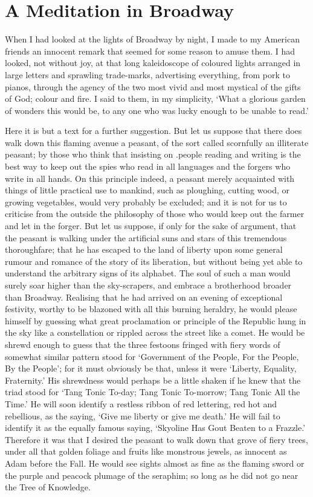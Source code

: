 \documentclass{book}
\begin{document}
\chapter{A Meditation in Broadway}
\label{chapter-2}
When I had looked at the lights of Broadway by night, I made to my American friends an innocent remark that seemed for some reason to amuse them. I had looked, not without joy, at that long kaleidoscope of coloured lights arranged in large letters and sprawling trade-marks, advertising everything, from pork to pianos, through the agency of the two most vivid and most mystical of the gifts of God; colour and fire. I said to them, in my simplicity, ‘What a glorious garden of wonders this would be, to any one who was lucky enough to be unable to read.’

Here it is but a text for a further suggestion. But let us suppose that there does walk down this flaming avenue a peasant, of the sort called scornfully an illiterate peasant; by those who think that insisting on .people reading and writing is the best way to keep out the spies who read in all languages and the forgers who write in all hands. On this principle indeed, a peasant merely acquainted with things of little practical use to mankind, such as ploughing, cutting wood, or growing vegetables, would very probably be excluded; and it is not for us to criticise from the outside the philosophy of those who would keep out the farmer and let in the forger. But let us suppose, if only for the sake of argument, that the peasant is walking under the artificial suns and stars of this tremendous thoroughfare; that he has escaped to the land of liberty upon some general rumour and romance of the story of its liberation, but without being yet able to understand the arbitrary signs of its alphabet. The soul of such a man would surely soar higher than the sky-scrapers, and embrace a brotherhood broader than Broadway. Realising that he had arrived on an evening of exceptional festivity, worthy to be blazoned with all this burning heraldry, he would please himself by guessing what great proclamation or principle of the Republic hung in the sky like a constellation or rippled across the street like a comet. He would be shrewd enough to guess that the three festoons fringed with fiery words of somewhat similar pattern stood for ‘Government of the People, For the People, By the People’; for it must obviously be that, unless it were ‘Liberty, Equality, Fraternity.’ His shrewdness would perhaps be a little shaken if he knew that the triad stood for ‘Tang Tonic To-day; Tang Tonic To-morrow; Tang Tonic All the Time.’ He will soon identify a restless ribbon of red lettering, red hot and rebellious, as the saying, ‘Give me liberty or give me death.’ He will fail to identify it as the equally famous saying, ‘Skyoline Has Gout Beaten to a Frazzle.’ Therefore it was that I desired the peasant to walk down that grove of fiery trees, under all that golden foliage and fruits like monstrous jewels, as innocent as Adam before the Fall. He would see sights almost as fine as the flaming sword or the purple and peacock plumage of the seraphim; so long as he did not go near the Tree of Knowledge.
\end{document}
